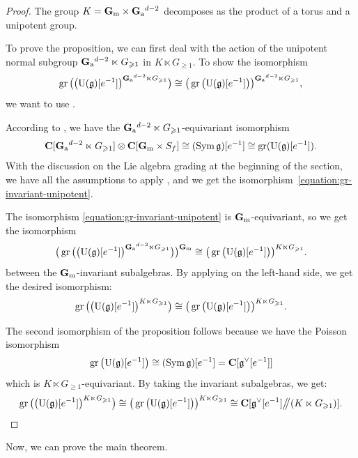 \begin{proof}
	The group $K = \mathbf{G}_\mathrm{m} \times \mathbf{G}_\mathrm{a}{}^{d-2}$ decomposes as the product of a torus and a unipotent group.
	
	To prove the proposition, we can first deal with the action of the unipotent normal subgroup $\mathbf{G}_\mathrm{a}{}^{d-2} \ltimes G_{\geqslant 1}$ in $K \ltimes G_{\geqslant 1}$. To show the isomorphism
	\begin{equation} \label{equation:gr-invariant-unipotent} \operatorname{gr} \big(\big(\mathrm U(\mathfrak g)[e^{-1}]\big)^{\mathbf{G}_\mathrm{a}{}^{d-2} \ltimes G_{\geqslant 1}}\big) \cong \big(\operatorname{gr} \big(\mathrm U(\mathfrak g)[e^{-1}]\big)\big)^{\mathbf{G}_\mathrm{a}{}^{d-2}\ltimes G_{\geqslant 1}}, \end{equation}
	we want to use . 
	
	According to , we have the $\mathbf{G}_\mathrm{a}{}^{d-2} \ltimes G_{\geqslant 1}$-equivariant isomorphism
	\[ \mathbf{C}[\mathbf{G}_\mathrm{a}{}^{d-2} \ltimes G_{\geqslant 1}] \otimes \mathbf{C}[\mathbf{G}_\mathrm{m} \times S_f] \cong (\operatorname{Sym} \mathfrak g)[e^{-1}] \cong \operatorname{gr} (\mathrm U(\mathfrak g)[e^{-1}]).  \]
	With the discussion on the Lie algebra grading at the beginning of the section, we have all the assumptions to apply , and we get the isomorphism~\eqref{equation:gr-invariant-unipotent}.
	
	The isomorphism \eqref{equation:gr-invariant-unipotent} is $\mathbf{G}_\mathrm{m}$-equivariant, so we get the isomorphism
	\[ \big(\operatorname{gr} \big(\big(\mathrm U(\mathfrak g)[e^{-1}]\big)^{\mathbf{G}_\mathrm{a}{}^{d-2} \ltimes G_{\geqslant 1}}\big)\big)^{\mathbf{G}_\mathrm{m}} \cong \big(\operatorname{gr} \big(\mathrm U(\mathfrak g)[e^{-1}]\big)\big)^{K \ltimes G_{\geqslant 1}}. \]
	between the $\mathbf{G}_\mathrm{m}$-invariant subalgebras. By applying  on the left-hand side, we get the desired isomorphism:
	\[ \operatorname{gr} \big(\big(\mathrm U(\mathfrak g)[e^{-1}]\big)^{K \ltimes G_{\geqslant 1}}\big) \cong \big(\operatorname{gr} \big(\mathrm U(\mathfrak g)[e^{-1}]\big)\big)^{K \ltimes G_{\geqslant 1}}. \]
	
	The second isomorphism of the proposition follows because we have the Poisson isomorphism
	\[ \operatorname{gr} \big(\mathrm U(\mathfrak g)[e^{-1}]\big) \cong (\operatorname{Sym} \mathfrak g)[e^{-1}] = \mathbf{C}[\mathfrak g^\vee[e^{-1}]] \]
	which is $K \ltimes G_{\geqslant 1}$-equivariant. By taking the invariant subalgebras, we get:
	\[ \operatorname{gr} \big(\big(\mathrm U(\mathfrak g)[e^{-1}]\big)^{K \ltimes G_{\geqslant 1}}\big) \cong \big(\operatorname{gr} \big(\mathrm U(\mathfrak g)[e^{-1}]\big)\big)^{K \ltimes G_{\geqslant 1}} \cong \mathbf{C}[\mathfrak g^\vee[e^{-1}] \big/\!\!\big/ (K \ltimes G_{\geqslant 1})]. \]
\end{proof}

Now, we can prove the main theorem.

